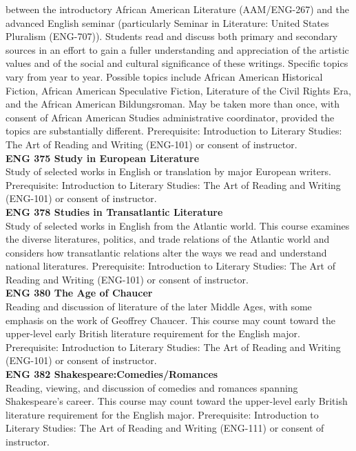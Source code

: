 \documentclass[
  letterpaper,
]{scrbook}
\begin{document}
between the introductory African American Literature (AAM/ENG-267) and
the advanced English seminar (particularly Seminar in Literature: United
States Pluralism (ENG-707)). Students read and discuss both primary and
secondary sources in an effort to gain a fuller understanding and
appreciation of the artistic values and of the social and cultural
significance of these writings. Specific topics vary from year to year.
Possible topics include African American Historical Fiction, African
American Speculative Fiction, Literature of the Civil Rights Era, and
the African American Bildungsroman. May be taken more than once, with
consent of African American Studies administrative coordinator, provided
the topics are substantially different. Prerequisite: Introduction to
Literary Studies: The Art of Reading and Writing (ENG-101) or consent of
instructor.\\
\textbf{ENG 375 Study in European Literature}\\
Study of selected works in English or translation by major European
writers. Prerequisite: Introduction to Literary Studies: The Art of
Reading and Writing (ENG-101) or consent of instructor.\\
\textbf{ENG 378 Studies in Transatlantic Literature}\\
Study of selected works in English from the Atlantic world. This course
examines the diverse literatures, politics, and trade relations of the
Atlantic world and considers how transatlantic relations alter the ways
we read and understand national literatures. Prerequisite: Introduction
to Literary Studies: The Art of Reading and Writing (ENG-101) or consent
of instructor.\\
\textbf{ENG 380 The Age of Chaucer}\\
Reading and discussion of literature of the later Middle Ages, with some
emphasis on the work of Geoffrey Chaucer. This course may count toward
the upper-level early British literature requirement for the English
major. Prerequisite: Introduction to Literary Studies: The Art of
Reading and Writing (ENG-101) or consent of instructor.\\
\textbf{ENG 382 Shakespeare:Comedies/Romances}\\
Reading, viewing, and discussion of comedies and romances spanning
Shakespeare's career. This course may count toward the upper-level early
British literature requirement for the English major. Prerequisite:
Introduction to Literary Studies: The Art of Reading and Writing
(ENG-111) or consent of instructor.\\
\end{document}
